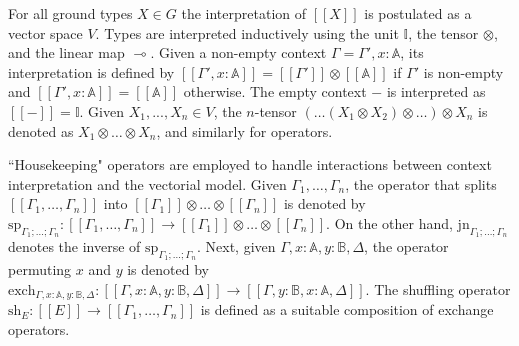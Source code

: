 For all ground types $X \in G$  the interpretation of $[\![X]\!]$  is postulated as a vector space $V$. Types are interpreted inductively using the unit $\mathbb{I}$, the tensor $\otimes$, and the linear map $\multimap$. Given a non-empty context $\Gamma=\Gamma',x: \mathbb{A}$, its interpretation is defined by $[\![\Gamma',x: \mathbb{A}]\!] = [\![\Gamma']\!] \otimes [\![\mathbb{A}]\!]$ if $\Gamma'$ is non-empty and $[\![\Gamma',x: \mathbb{A}]\!] = [\![\mathbb{A}]\!]$ otherwise. The empty context $-$ is interpreted as $[\![-]\!] = \mathbb{I}$. Given $X_{1}, . . . ,X_{n} \in V$, the $n$-tensor $(\ldots (X_1 \otimes X_2) \otimes \ldots ) \otimes X_{n}$ is denoted as $X_1 \otimes \ldots \otimes X_{n}$, and similarly for operators. 


``Housekeeping" operators are employed to handle interactions between context interpretation and the vectorial model. Given $\Gamma_{1}, \ldots, \Gamma_{n}$, the operator that splits $[\![\Gamma_{1}, \ldots, \Gamma_{n}]\!]$ into $[\![\Gamma_{1}]\!] \otimes \ldots \otimes [\![\Gamma_{n}]\!]  $ is denoted by $\text{sp}_{\Gamma_1;\ldots;\Gamma_n}: [\![\Gamma_{1}, \ldots, \Gamma_{n}]\!] \xrightarrow{} [\![\Gamma_{1}]\!] \otimes \ldots \otimes [\![\Gamma_{n}]\!] $.
On the other hand, $\text{jn}_{\Gamma_1;\ldots;\Gamma_n}$ denotes the inverse of $\text{sp}_{\Gamma_1;\ldots;\Gamma_n}$. Next, given $\Gamma, x : \mathbb{A}, y : \mathbb{B},\Delta$, the operator permuting $x$ and $y$ is denoted by $\text{exch}_{\Gamma, x : \mathbb{A}, y : \mathbb{B},\Delta}: [\![\Gamma, x : \mathbb{A}, y : \mathbb{B},\Delta]\!] \xrightarrow{} [\![\Gamma, y : \mathbb{B}, x : \mathbb{A}, \Delta]\!] $. The shuffling operator $\text{sh}_{E}: [\![E]\!] \xrightarrow{} [\![\Gamma_1, \ldots, \Gamma_n ]\!]$ is defined as a suitable composition
of exchange operators.

